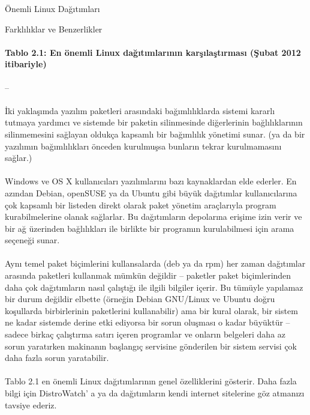 \documentclass[10pt,a5paper]{book}
\begin{document}
\begin{section}{Önemli Linux Dağıtımları}
\begin{subsection}{Farklılıklar ve Benzerlikler}
\paragraph{Tablo 2.1: En önemli Linux dağıtımlarının karşılaştırması (Şubat 2012 itibariyle)}{ --}
\paragraph{}{İki yaklaşımda yazılım paketleri arasındaki bağımlılıklarda sistemi kararlı tutmaya yardımcı ve sistemde bir paketin silinmesinde diğerlerinin bağlılıklarının silinmemesini sağlayan oldukça kapsamlı bir bağımlılık yönetimi sunar. (ya da bir yazılımın bağımlılıkları önceden kurulmuşsa bunların tekrar kurulmamasını sağlar.)}
\paragraph{}{Windows ve OS X kullanıcıları yazılımlarını bazı kaynaklardan elde ederler. En azından Debian, openSUSE ya da Ubuntu gibi büyük dağıtımlar kullanıcılarına çok kapsamlı bir listeden direkt olarak paket yönetim araçlarıyla program kurabilmelerine olanak sağlarlar. Bu dağıtımların depolarına erişime izin verir ve bir ağ üzerinden bağlılıkları ile birlikte bir programın kurulabilmesi için arama seçeneği sunar.}
\paragraph{}{Aynı temel paket biçimlerini kullansalarda (deb ya da rpm) her zaman dağıtımlar arasında paketleri kullanmak mümkün değildir – paketler paket biçimlerinden daha çok dağıtımların nasıl çalıştığı ile ilgili bilgiler içerir. Bu tümüyle yapılamaz bir durum değildir elbette (örneğin Debian GNU/Linux ve Ubuntu doğru koşullarda birbirlerinin paketlerini kullanabilir) ama bir kural olarak, bir sistem ne kadar sistemde derine etki ediyorsa bir sorun oluşması o kadar büyüktür – sadece birkaç çalıştırma satırı içeren programlar ve onların belgeleri daha az sorun yaratırken makinanın başlangıç servisine gönderilen bir sistem servisi çok daha fazla sorun yaratabilir.}
\paragraph{}{Tablo 2.1 en önemli Linux dağıtımlarının genel özelliklerini gösterir. Daha fazla bilgi için DistroWatch' a ya da dağıtımların kendi internet sitelerine göz atmanızı tavsiye ederiz.}

\end{subsection}
\end{section}
\end{document}
